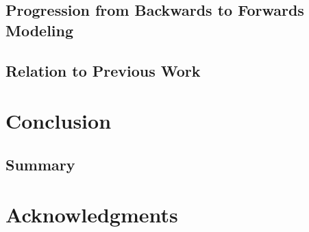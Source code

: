 \documentclass[usenatbib,usegraphicx,letterpaper]{mn2e}
\begin{document}
\subsection{Progression from Backwards to Forwards Modeling}
\label{subsec:forwardsmodeling}

\subsection{Relation to Previous Work}
\label{subsec:previouswork}


\section{Conclusion}
\label{sec:conclusion}

\subsection{Summary}
\label{subsec:summary}

\section*{Acknowledgments}


\end{document}
